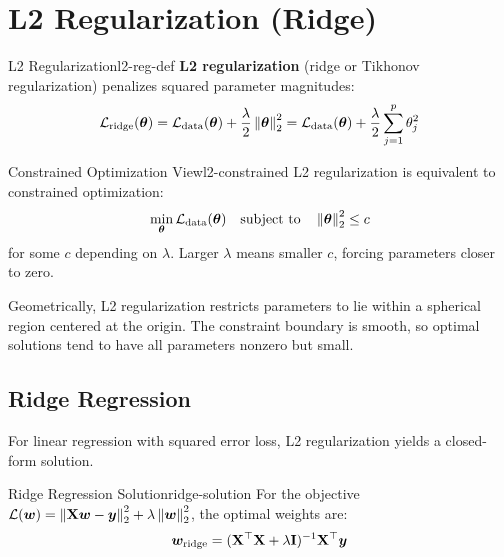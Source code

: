 \documentclass[../../main.tex]{subfiles}
\begin{document}
\section{L2 Regularization (Ridge)}
\label{sec:l2-regularization}

\begin{definition}{L2 Regularization}{l2-reg-def}
\textbf{L2 regularization} (ridge or Tikhonov regularization) penalizes squared parameter magnitudes:
\[
    \mathcal{L}_{\text{ridge}}(\boldsymbol{\theta}) = \mathcal{L}_{\text{data}}(\boldsymbol{\theta}) + \frac{\lambda}{2}\left\lVert \boldsymbol{\theta} \right\rVert_2^2 = \mathcal{L}_{\text{data}}(\boldsymbol{\theta}) + \frac{\lambda}{2}\sum_{j=1}^{p} \theta_j^2
\]
\end{definition}

\begin{theorem}{Constrained Optimization View}{l2-constrained}
L2 regularization is equivalent to constrained optimization:
\[
    \min_{\boldsymbol{\theta}} \mathcal{L}_{\text{data}}(\boldsymbol{\theta}) \quad \text{subject to} \quad \left\lVert \boldsymbol{\theta} \right\rVert_2^2 \leq c
\]
for some $c$ depending on $\lambda$. Larger $\lambda$ means smaller $c$, forcing parameters closer to zero.
\end{theorem}

\begin{intuition}
Geometrically, L2 regularization restricts parameters to lie within a spherical region centered at the origin. The constraint boundary is smooth, so optimal solutions tend to have all parameters nonzero but small.
\end{intuition}

\subsection{Ridge Regression}

For linear regression with squared error loss, L2 regularization yields a closed-form solution.

\begin{theorem}{Ridge Regression Solution}{ridge-solution}
For the objective $\mathcal{L}(\boldsymbol{w}) = \left\lVert \mathbf{X}\boldsymbol{w} - \boldsymbol{y} \right\rVert_2^2 + \lambda\left\lVert \boldsymbol{w} \right\rVert_2^2$, the optimal weights are:
\[
    \boldsymbol{w}_{\text{ridge}} = (\mathbf{X}^\top\mathbf{X} + \lambda\mathbf{I})^{-1}\mathbf{X}^\top\boldsymbol{y}
\]
\end{theorem}
\end{document}
